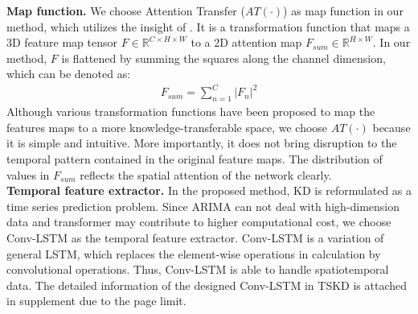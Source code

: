 \documentclass[letterpaper]{article} %
\begin{document}
\noindent\textbf{Map function.} We choose Attention Transfer ($AT(\cdot)$) as map function in our method, which utilizes the insight of \cite{zagoruyko2016paying}. It is a transformation function that maps a 3D feature map tensor $F \in \mathbb{R}^{C\times H\times W}$ to a 2D attention map $F_{sum} \in \mathbb{R}^{H\times W}$. In our method, $F$ is flattened by summing the squares along the channel dimension, which can be denoted as:
\begin{align}
    F_{sum} = \textstyle \sum _{n=1}^{C}|F_{n}|^{2}
\end{align}
Although various transformation functions have been proposed \cite{tian2019contrastive, heo2019comprehensive} to map the features maps to a more knowledge-transferable space, we choose $AT(\cdot)$ because it is simple and intuitive. More importantly, it does not bring disruption to the temporal pattern contained in the original feature maps. The distribution of values in $F_{sum}$ reflects the spatial attention of the network clearly. 
\\
\noindent\textbf{Temporal feature extractor.} In the proposed method, KD is reformulated as a time series prediction problem. Since ARIMA \cite{box1970distribution} can not deal with high-dimension data and transformer \cite{vaswani2017attention} may contribute to higher computational cost, we choose Conv-LSTM \cite{shi2015convolutional} as the temporal feature extractor.  
Conv-LSTM is a variation of general LSTM, which replaces the element-wise operations in calculation by convolutional operations. Thus, Conv-LSTM is able to handle spatiotemporal data. The detailed information of the designed Conv-LSTM in TSKD is attached in supplement due to the page limit.
\end{document}
